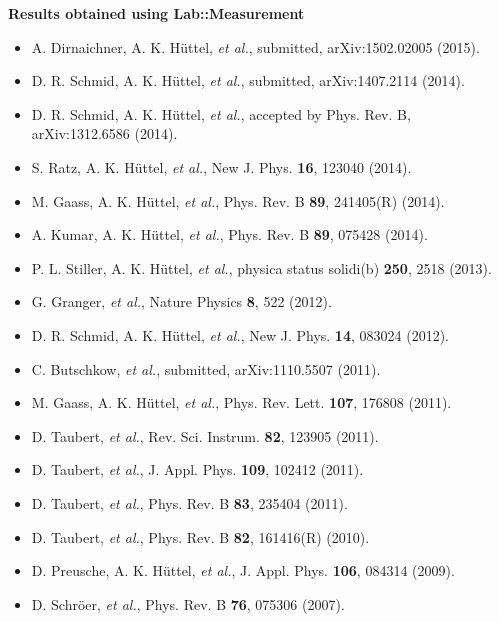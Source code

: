 \documentclass[portrait]{a0poster}
\newcommand{\smallheading}[1]{
  {\color{heading}\textbf{\Large #1}}\\
}
\begin{document}
{\begin{minipage}[t][\columnheighta-2\fboxsep-2\fboxrule][t]
\begin{minipage}{\textwidth}
\vspace*{2cm}
\begin{minipage}{\textwidth}
\smallheading{Results obtained using Lab::Measurement}
{\renewcommand{\baselinestretch}{0.2}\footnotesize
\begin{itemize}
\item A. Dirnaichner, A. K. Hüttel, {\it et al.}, submitted, arXiv:1502.02005 
(2015).
\item D. R. Schmid, A. K. Hüttel, {\it et al.}, submitted, arXiv:1407.2114 
(2014).
\item D. R. Schmid, A. K. Hüttel, {\it et al.}, accepted by Phys. Rev. B, arXiv:1312.6586 
(2014).
\item S. Ratz, A. K. Hüttel, {\it et al.}, New J. Phys. {\bf 16}, 123040 (2014).
\item M. Gaass, A. K. Hüttel, {\it et al.}, Phys. Rev. B {\bf 89}, 241405(R)
(2014).
\item A. Kumar, A. K. Hüttel, {\it et al.}, Phys. Rev. B {\bf 89}, 075428 
(2014).
\item P. L. Stiller, A. K. Hüttel, {\it et al.}, physica status solidi(b) 
{\bf 250}, 2518 (2013).
\item G. Granger, {\it et al.}, Nature Physics {\bf 8}, 522 (2012).
\item D. R. Schmid, A. K. H\"uttel, {\it et al.}, New J. Phys. {\bf 14}, 083024 
(2012).
\item C. Butschkow, {\it et al.}, submitted, arXiv:1110.5507 (2011).
\item M. Gaass, A. K. H\"uttel, {\it et al.}, Phys. Rev. Lett. {\bf 107}, 176808
(2011).
\item D. Taubert, {\it et al.}, Rev. Sci. Instrum. {\bf 82}, 123905 (2011).
\item D. Taubert, {\it et al.}, J. Appl. Phys. {\bf 109}, 102412 (2011).
\item D. Taubert, {\it et al.}, Phys. Rev. B {\bf 83}, 235404 (2011).
\item D. Taubert, {\it et al.}, Phys. Rev. B {\bf 82}, 161416(R) (2010).
\item D. Preusche, A. K. H\"uttel, {\it et al.}, J. Appl. Phys. {\bf 106},
084314 (2009).
\item D. Schr\"oer, {\it et al.}, Phys. Rev. B {\bf 76}, 075306 (2007).

\end{itemize}
\renewcommand{\baselinestretch}{1}}
\end{minipage}









 \end{minipage}

\end{minipage}}  %
%
%
%
\end{document}
